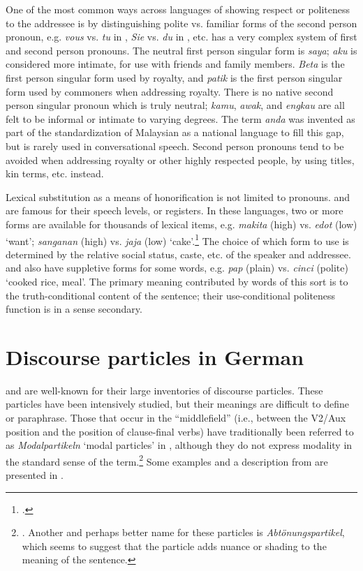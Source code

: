 One of the most common ways across languages of showing respect or politeness to the addressee is by distinguishing polite vs. familiar forms of the second person pronoun, e.g. \textit{vous} vs. \textit{tu} in , \textit{Sie} vs. \textit{du} in , etc.  has a very complex system of first and second person pronouns. The neutral first person singular form is \textit{saya}; \textit{aku} is considered more intimate, for use with friends and family members. \textit{Beta} is the first person singular form used by royalty, and \textit{patik} is the first person singular form used by commoners when addressing royalty. There is no native  second person singular pronoun which is truly neutral; \textit{kamu}, \textit{awak}, and \textit{engkau} are all felt to be informal or intimate to varying degrees. The term \textit{anda} was invented as part of the standardization of Malaysian as a national language to fill this gap, but is rarely used in conversational speech. Second person pronouns tend to be avoided when addressing royalty or other highly respected people, by using titles, kin terms, etc. instead.



Lexical substitution as a means of honorification is not limited to pronouns.  and  are famous for their speech levels, or registers. In these languages, two or more forms are available for thousands of lexical items, e.g.  \textit{makita} (high) vs. \textit{edot} (low) ‘want’; \textit{sanganan} (high) vs. \textit{jaja} (low) ‘cake’.\footnote{\citet{Arka2005}.} The choice of which form to use is determined by the relative social status, caste, etc. of the speaker and addressee.  and  also have suppletive forms for some words, e.g.  \textit{pap} (plain) vs. \textit{cinci} (polite) ‘cooked rice, meal’. The primary meaning contributed by words of this sort is to the truth-conditional content of the sentence; their use-conditional politeness function is in a sense secondary.


\section{Discourse particles in German}\label{sec:11.6}

 and  are well-known for their large inventories of discourse particles. These particles have been intensively studied, but their meanings are difficult to define or paraphrase. Those that occur in the “middlefield” (i.e., between the V2/Aux position and the position of clause-final verbs) have traditionally been referred to as \textit{Modalpartikeln} ‘modal particles’ in , although they do not express modality in the standard sense of the term.\footnote{\citet[45--46]{Palmer1986}. Another and perhaps better name for these particles is \textit{Abtönungspartikel}, which seems to suggest that the particle adds nuance or shading to the meaning of the sentence.} Some examples and a description from \citet[2013]{Zimmermann2011} are presented in .


